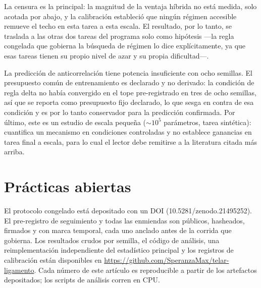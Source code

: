 \documentclass[jou,11pt,donotrepeattitle]{apa7}
\begin{document}
La censura es la principal: la magnitud de la ventaja h\'ibrida no est\'a medida, solo acotada
por abajo, y la calibraci\'on estableci\'o que ning\'un r\'egimen accesible remueve el techo en
esta tarea a esta escala. El resultado, por lo tanto, se traslada a las otras dos tareas del
programa solo como hip\'otesis ---la regla congelada que gobierna la b\'usqueda de r\'egimen lo
dice expl\'icitamente, ya que esas tareas tienen su propio nivel de azar y su propia dificultad---.

La predicci\'on de anticorrelaci\'on tiene potencia insuficiente con ocho semillas. El
presupuesto com\'un de entrenamiento es declarado y no derivado: la condici\'on de regla delta no
hab\'ia convergido en el tope pre-registrado en tres de ocho semillas, as\'i que se reporta como
presupuesto fijo declarado, lo que sesga en contra de esa condici\'on y es por lo tanto
conservador para la predicci\'on confirmada. Por \'ultimo, este es un estudio de escala peque\~na
($\sim$$10^5$ par\'ametros, tarea sint\'etica): cuantifica un mecanismo en condiciones
controladas y no establece ganancias en tarea final a escala, para lo cual el lector debe
remitirse a la literatura citada m\'as arriba.

\section*{Pr\'acticas abiertas}

El protocolo congelado est\'a depositado con un DOI (10.5281/zenodo.21495252). El pre-registro
de seguimiento y todas las enmiendas son p\'ublicos, hasheados, firmados y con marca temporal,
cada uno anclado antes de la corrida que gobierna. Los resultados crudos por semilla, el
c\'odigo de an\'alisis, una reimplementaci\'on independiente del estad\'istico principal y los
registros de calibraci\'on est\'an disponibles en
\url{https://github.com/SperanzaMax/telar-ligamento}. Cada n\'umero de este art\'iculo es
reproducible a partir de los artefactos depositados; los scripts de an\'alisis corren en CPU.

\printbibliography
\end{document}
